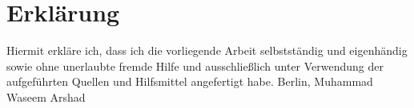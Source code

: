 \chapter*{Erkl{\"a}rung}
Hiermit erkl{\"a}re ich, dass ich die vorliegende Arbeit selbstst{\"a}ndig und eigenh{\"a}ndig sowie ohne unerlaubte fremde Hilfe und ausschlie{\ss}lich unter Verwendung der aufgef{\"u}hrten Quellen und Hilfsmittel angefertigt habe.
\newline
\newline
\newline
Berlin, %
\newline
\newline
\newline
\newline
\newline
Muhammad Waseem Arshad

